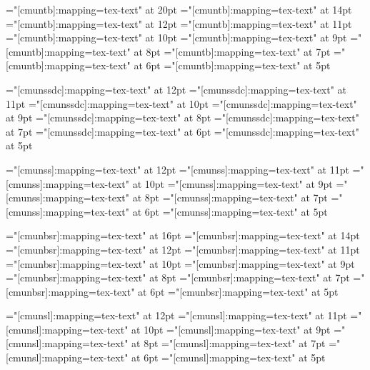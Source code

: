 \font\twentyttbf="[cmuntb]:mapping=tex-text"     at 20pt
\font\fourteenttbf="[cmuntb]:mapping=tex-text"   at 14pt
\font\twelvettbf="[cmuntb]:mapping=tex-text"     at 12pt
\font\eleventtbf="[cmuntb]:mapping=tex-text"     at 11pt
\font\tenttbf="[cmuntb]:mapping=tex-text"        at 10pt
\font\ninettbf="[cmuntb]:mapping=tex-text"       at 9pt
\font\eighttbft="[cmuntb]:mapping=tex-text"      at 8pt
\font\seventtbf="[cmuntb]:mapping=tex-text"      at 7pt
\font\sixttbf="[cmuntb]:mapping=tex-text"        at 6pt
\font\fivettbf="[cmuntb]:mapping=tex-text"       at 5pt

\font\twelvessdc="[cmunssdc]:mapping=tex-text"  at 12pt
\font\elevenssdc="[cmunssdc]:mapping=tex-text"  at 11pt
\font\tenssdc="[cmunssdc]:mapping=tex-text"     at 10pt
\font\ninessdc="[cmunssdc]:mapping=tex-text"    at 9pt
\font\eightssdc="[cmunssdc]:mapping=tex-text"   at 8pt
\font\sevenssdc="[cmunssdc]:mapping=tex-text"   at 7pt
\font\sixssdc="[cmunssdc]:mapping=tex-text"     at 6pt
\font\fivessdc="[cmunssdc]:mapping=tex-text"    at 5pt

\font\twelvess="[cmunss]:mapping=tex-text"      at 12pt
\font\elevenss="[cmunss]:mapping=tex-text"      at 11pt
\font\tenss="[cmunss]:mapping=tex-text"         at 10pt
\font\niness="[cmunss]:mapping=tex-text"        at 9pt
\font\eightss="[cmunss]:mapping=tex-text"       at 8pt
\font\sevenss="[cmunss]:mapping=tex-text"       at 7pt
\font\sixss="[cmunss]:mapping=tex-text"         at 6pt
\font\fivess="[cmunss]:mapping=tex-text"        at 5pt

\font\sixteenssbf="[cmunbsr]:mapping=tex-text"  at 16pt
\font\fourteenssbf="[cmunbsr]:mapping=tex-text" at 14pt
\font\twelvessbf="[cmunbsr]:mapping=tex-text"   at 12pt
\font\elevenssbf="[cmunbsr]:mapping=tex-text"   at 11pt
\font\tenssbf="[cmunbsr]:mapping=tex-text"      at 10pt
\font\ninessbf="[cmunbsr]:mapping=tex-text"     at 9pt
\font\eightssbf="[cmunbsr]:mapping=tex-text"    at 8pt
\font\sevenssbf="[cmunbsr]:mapping=tex-text"    at 7pt
\font\sixssbf="[cmunbsr]:mapping=tex-text"      at 6pt
\font\fivessbf="[cmunbsr]:mapping=tex-text"     at 5pt

\font\twelvesl="[cmunsl]:mapping=tex-text"      at 12pt
\font\elevensl="[cmunsl]:mapping=tex-text"      at 11pt
\font\tensl="[cmunsl]:mapping=tex-text"         at 10pt
\font\ninesl="[cmunsl]:mapping=tex-text"        at 9pt
\font\eightsl="[cmunsl]:mapping=tex-text"       at 8pt
\font\sevensl="[cmunsl]:mapping=tex-text"       at 7pt
\font\sixsl="[cmunsl]:mapping=tex-text"         at 6pt
\font\fivesl="[cmunsl]:mapping=tex-text"        at 5pt

